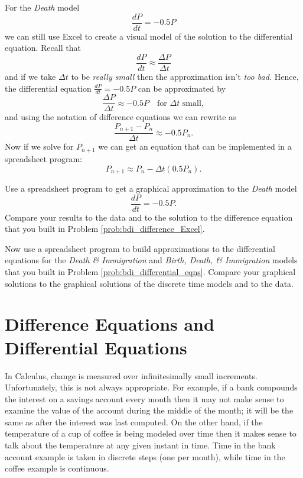 For the {\it Death} model
\[ \frac{dP}{dt} = -0.5P \]
we can still use Excel to create a visual model of the solution to the differential
equation.  Recall that 
\[ \frac{dP}{dt} \approx \frac{\Delta P}{\Delta t} \]
and if we take $\Delta t$ to be {\it really small} then the approximation isn't {\it too
bad.}  Hence, the differential equation $\frac{dP}{dt} = -0.5 P$ can be approximated by
\[ \frac{\Delta P}{\Delta t} \approx -0.5 P \quad \text{for $\Delta t$ small}, \]
and using the notation of difference equations we can rewrite as
\[ \frac{P_{n+1} - P_n}{\Delta t} \approx -0.5 P_n. \]
Now if we solve for $P_{n+1}$ we can get an equation that can be implemented in a
spreadsheet program:
\[ P_{n+1} \approx P_n - \Delta t \left( 0.5 P_n \right). \]

\begin{problem}
    Use a spreadsheet program to get a graphical approximation to the {\it Death} model
    \[ \frac{dP}{dt} = -0.5P. \]
    Compare your results to the data and to the solution to the difference equation that
    you built in Problem \ref{prob:bdi_difference_Excel}.
\end{problem}

\begin{problem}
    Now use a spreadsheet program to build approximations to the differential equations
    for the {\it Death \& Immigration} and {\it Birth, Death, \& Immigration} models that you built in
    Problem \ref{prob:bdi_differential_eqns}.  Compare your graphical solutions to the
    graphical solutions of the discrete time models and to the data.
\end{problem}

\newpage\section{Difference Equations and Differential Equations}
In Calculus, change is measured over infinitesimally small increments.  Unfortunately, this
is not always appropriate.  For example, if a bank compounds the interest on a savings
account every month then it may not make sense to examine the value of the account during
the middle of the month; it will be the same as after the interest was last computed.  On
the other hand, if the temperature of a cup of coffee is being modeled over time then it
makes sense to talk about the temperature at any given instant in time.  Time in the bank account
example is taken in discrete steps (one per month), while time in the coffee example is
continuous.

